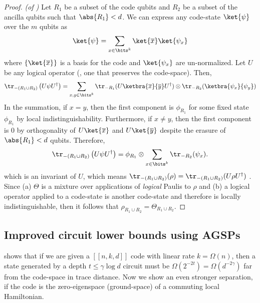\documentclass{toc}
\begin{document}
\begin{proof}
\textit{(of )}
Let $R_1$ be a subset of the code qubits and $R_2$ be a subset of the ancilla qubits such that $\abs{R_1} < d$. We can express any code-state $\ket{\psi}$ over the $m$ qubits as
\begin{align}
    \ket{\psi} = \sum_{x \in \bits^k} \ket{\overline{x}} \ket{\psi_x}
\end{align}
where $\{\ket{\overline{x}}\}$ is a basis for the code and $\ket{\psi_x}$ are un-normalized. Let $U$ be any logical operator (\ie, one that preserves the code-space). Then,
\begin{align}
\tr_{-(R_1 \cup R_2)}\left(U \psi U^\dagger\right) = \sum_{x,y \in \bits^k} \tr_{-R_1}(U \ketbra{\overline{x}}{\overline{y}} U^\dagger) \otimes \tr_{-R_2} (\ketbra{\psi_x}{\psi_y})
\end{align}
In the summation, if $x = y$, then the first component is $\phi_{R_1}$ for some fixed state $\phi_{R_1}$ by local indistinguishability. Furthermore, if $x \neq y$, then the first component is $0$ by orthogonality of $U\ket{\overline{x}}$ and $U\ket{\overline{y}}$ despite the erasure of $\abs{R_1} < d$ qubits. Therefore,
\begin{align}
    \tr_{-(R_1 \cup R_2)} \left(U \psi U^\dagger \right) = \phi_{R_1} \otimes \sum_{x \in \bits^k}  \tr_{-R_2}(\psi_x).
\end{align}
which is an invariant of $U$, which means $\tr_{-(R_1 \cup R_2)}(\rho) = \tr_{-(R_1 \cup R_2)}(U \rho U^\dagger)$ . Since (a) $\Theta$ is a mixture over applications of \emph{logical} Paulis to $\rho$ and (b) a logical operator applied to a code-state is another code-state and therefore is locally indistinguishable, then it follows that $\rho_{R_1 \cup R_2} = \Theta_{R_1 \cup R_2}$.
\end{proof}

\subsection{Improved circuit lower bounds using AGSPs}

 shows that if we are given a $[[n,k,d]]$ code with linear rate $k=\Omega(n)$, then a state generated by a depth $t \leq \gamma\log d$ circuit must be $\Omega\left(2^{-2t}\right)=\Omega\left(d^{-2\gamma}\right)$ far from the code-space in trace distance. Now we show an even stronger separation, if the code is the zero-eigenspace (ground-space) of a commuting local Hamiltonian. 
\end{document}
